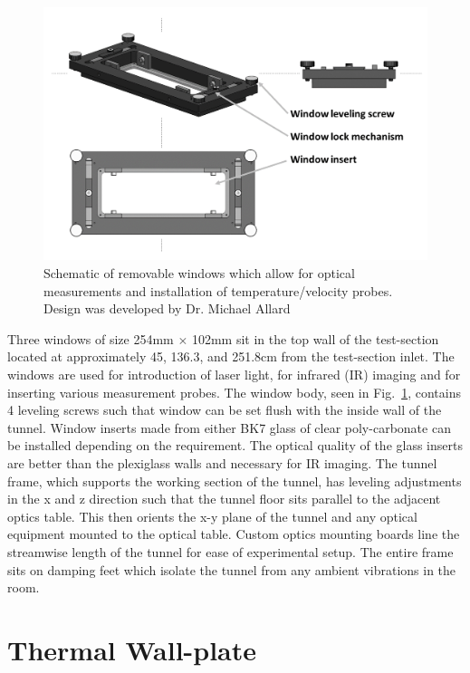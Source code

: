 \begin{figure}[h!]
\centering
\includegraphics[scale=.45]{figures/facility/tunnelwindows.png}
\caption{Schematic of removable windows which allow for optical measurements and installation of temperature/velocity probes. Design was developed by Dr. Michael Allard}
\label{fig:tunnelWindow}
\end{figure}

Three windows of size 254mm $\times$ 102mm sit in the top wall of the test-section located at approximately 45, 136.3, and 251.8cm from the test-section inlet.
The windows are used for introduction of laser light, for infrared (IR) imaging and for inserting various measurement probes.
The window body, seen in Fig.~\ref{fig:tunnelWindow}, contains 4 leveling screws such that window can be set flush with the inside wall of the tunnel.
Window inserts made from either BK7 glass of clear poly-carbonate can be installed depending on the requirement.
The optical quality of the glass inserts are better than the plexiglass walls and necessary for IR imaging.
The tunnel frame, which supports the working section of the tunnel, has leveling adjustments in the x and z direction such that the tunnel floor sits parallel to the adjacent optics table. 
This then orients the x-y plane of the tunnel and any optical equipment mounted to the optical table.
Custom optics mounting boards line the streamwise length of the tunnel for ease of experimental setup.
The entire frame sits on damping feet which isolate the tunnel from any ambient vibrations in the room.

\section{Thermal Wall-plate}
